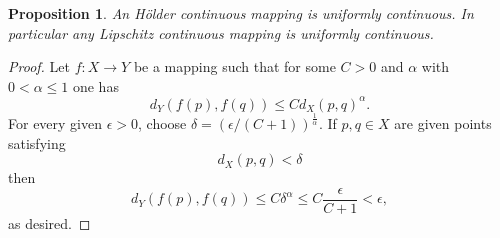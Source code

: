 \documentclass[12pt]{article}
\newtheorem{proposition}{Proposition}
\begin{document}
\begin{proposition}
An H\"o{}lder continuous mapping is uniformly continuous.
In particular any Lipschitz continuous mapping is uniformly continuous.
\end{proposition}
\begin{proof}
Let $f\colon X\to Y$ be a mapping such that for some $C>0$ and $\alpha$ with $0 < \alpha \le 1$ one
has
\[
  d_Y(f(p),f(q)) \le C d_X(p,q)^\alpha.
\]
For every given $\epsilon > 0$, choose
$\delta=\left(\epsilon/(C+1)\right)^{\frac 1 \alpha}$.
If $p,q\in X$ are given points satisfying
\[
d_X(p,q)<\delta
\]
then
\[
d_Y(f(p),f(q))\leq C \delta^\alpha \le C\frac{\epsilon}{C+1} < \epsilon,
\]
as desired.
\end{proof}
\end{document}

